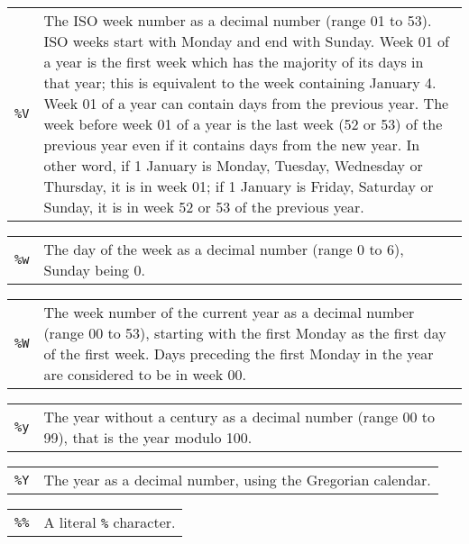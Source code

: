 \documentclass[10pt]{article}
\begin{document}
\medskip

\begin{tabular}{@{}p{20pt}p{298pt}@{}}
{\tt\%V}&The ISO week number as a decimal number (range 01 to 53). ISO
weeks start with Monday and end with Sunday. Week 01 of a year is the
first week which has the majority of its days in that year; this is
equivalent to the week containing January 4. Week 01 of a year can
contain days from the previous year. The week before week 01 of a year
is the last week (52 or 53) of the previous year even if it contains
days from the new year. In other word, if 1 January is Monday, Tuesday,
Wednesday or Thursday, it is in week 01; if 1 January is Friday,
Saturday or Sunday, it is in week 52 or 53 of the previous year.\\
\end{tabular}

\medskip

\begin{tabular}{@{}p{20pt}p{298pt}@{}}
{\tt\%w}&The day of the week as a decimal number (range 0 to 6), Sunday
being 0.\\
\end{tabular}

\medskip

\begin{tabular}{@{}p{20pt}p{298pt}@{}}
{\tt\%W}&The week number of the current year as a decimal number (range
00 to 53), starting with the first Monday as the first day of the first
week. Days preceding the first Monday in the year are considered to be
in week 00.\\
\end{tabular}

\medskip

\begin{tabular}{@{}p{20pt}p{298pt}@{}}
{\tt\%y}&The year without a century as a decimal number (range 00 to
99), that is the year modulo 100.\\
\end{tabular}

\medskip

\begin{tabular}{@{}p{20pt}p{298pt}@{}}
{\tt\%Y}&The year as a decimal number, using the Gregorian calendar.\\
\end{tabular}

\medskip

\begin{tabular}{@{}p{20pt}p{298pt}@{}}
{\tt\%\%}&A literal \verb|%| character.\\
\end{tabular}
\end{document}
